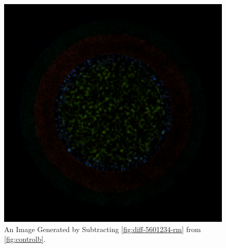\begin{figure}[H]
\centering
\includegraphics[width=0.6\linewidth]{figures/shuffle/diff-5601234}
\caption{An Image Generated by Subtracting \ref{fig:diff-5601234-rm} from \ref{fig:controlb}.}
\label{fig:diff-5601234}
\end{figure}